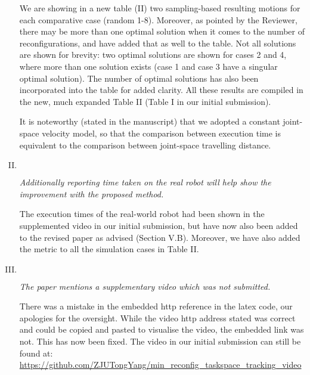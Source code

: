 \documentclass[11pt]{article}
\newenvironment{reviewer}
{\begin{mdframed}[roundcorner = 10pt,fontcolor=blue!70!black]\itshape}
{\end{mdframed}}
\begin{document}
\begin{enumerate}[I.]
We are showing in a new table (II) two sampling-based resulting motions for each comparative case (random 1-8). Moreover, as pointed by the Reviewer, there may be more than one optimal solution when it comes to the number of reconfigurations, and have added that as well to the table. Not all solutions are shown for brevity: two optimal solutions are shown for cases 2 and 4, where more than one solution exists (case 1 and case 3 have a singular optimal solution). The number of optimal solutions has also been incorporated into the table for added clarity. 
All these results are compiled in the new,  much expanded Table II (Table I in our initial submission). 

It is noteworthy (stated in the manuscript) that we adopted a constant joint-space velocity model, so that the comparison between execution time is equivalent to the comparison between joint-space travelling distance. 

\item $ $ 
  \begin{reviewer}
  Additionally reporting time taken on the real robot will help show the improvement with the proposed method. 
  \end{reviewer}

The execution times of the real-world robot had been shown in the supplemented video in our initial submission, but have now also been added to the revised paper as advised (Section V.B). 
Moreover, we have also added the metric to all the simulation cases in Table II.


  \item $ $
  \begin{reviewer}
   The paper mentions a supplementary video which was not submitted. 
  \end{reviewer}

\noindent

There was a mistake in the embedded http reference in the latex code, our apologies for the oversight. 
While the video http address stated was correct and could be copied and pasted to visualise the video, the embedded link was not. This has now been fixed.  
The video in our initial submission can still be found at: \\
\url{https://github.com/ZJUTongYang/min_reconfig_taskspace_tracking_video}


\end{enumerate}
\end{document}
